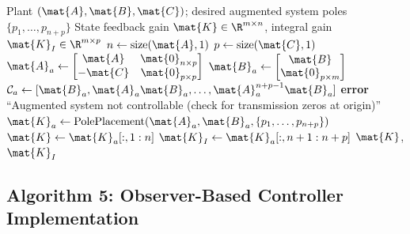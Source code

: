 \begin{algorithm}[H]
\caption{State Feedback with Integral Action}
\label{alg:integral_control}
\begin{algorithmic}[1]
\REQUIRE Plant $(\mat{A}, \mat{B}, \mat{C})$; desired augmented system poles $\{p_1, \ldots, p_{n+p}\}$
\ENSURE State feedback gain $\mat{K} \in \R^{m \times n}$, integral gain $\mat{K}_I \in \R^{m \times p}$
\STATE
{}
\STATE $n \gets \text{size}(\mat{A}, 1)$
\STATE $p \gets \text{size}(\mat{C}, 1)$
\STATE $\mat{A}_a \gets \begin{bmatrix} \mat{A} & \mat{0}_{n \times p} \\ -\mat{C} & \mat{0}_{p \times p} \end{bmatrix}$
\STATE $\mat{B}_a \gets \begin{bmatrix} \mat{B} \\ \mat{0}_{p \times m} \end{bmatrix}$
\STATE
{}
\STATE $\mathcal{C}_a \gets [\mat{B}_a, \mat{A}_a\mat{B}_a, \ldots, \mat{A}_a^{n+p-1}\mat{B}_a]$
    \STATE \textbf{error} ``Augmented system not controllable (check for transmission zeros at origin)''
\ENDIF
\STATE
{}
\STATE $\mat{K}_a \gets \text{PolePlacement}(\mat{A}_a, \mat{B}_a, \{p_1, \ldots, p_{n+p}\})$
\STATE
{}
\STATE $\mat{K} \gets \mat{K}_a[:, 1:n]$
\STATE $\mat{K}_I \gets \mat{K}_a[:, n+1:n+p]$
\STATE
\RETURN $\mat{K}$, $\mat{K}_I$
\end{algorithmic}
\end{algorithm}

\subsection{Algorithm 5: Observer-Based Controller Implementation}

